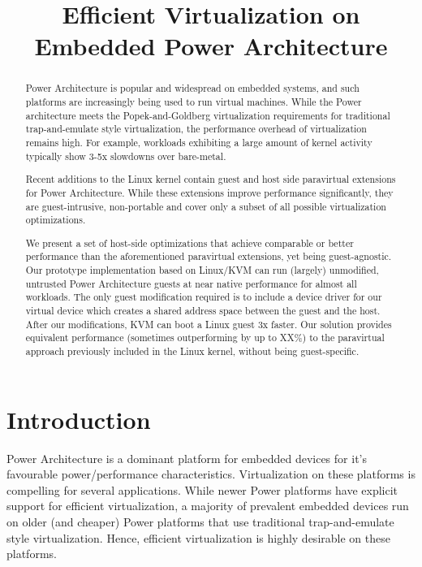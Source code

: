\documentclass[10pt,twocolumn]{article}
\begin{document}
\title{Efficient Virtualization on Embedded Power Architecture}
\author{}
\date{}
\maketitle
\thispagestyle{empty}

\maketitle
\begin{abstract}
  Power Architecture is popular and widespread on embedded systems, and such
  platforms are
  increasingly
  being used to run virtual machines\cite{XXX}. While the Power architecture meets the
  Popek-and-Goldberg virtualization requirements for traditional trap-and-emulate
  style virtualization, the performance overhead of virtualization remains high.
  For example, workloads exhibiting a large amount of kernel activity typically
  show 3-5x slowdowns over bare-metal.

  Recent additions to the Linux kernel contain guest and host side paravirtual
  extensions for Power Architecture. While these extensions improve performance significantly, they
  are guest-intrusive, non-portable and cover only a subset of all possible
  virtualization optimizations.

  We present a set of host-side optimizations that achieve comparable
  or better performance
  than the aforementioned paravirtual extensions, yet being guest-agnostic. Our
  prototype implementation based on Linux/KVM can run (largely) unmodified, untrusted
  Power Architecture guests at near native performance for almost all workloads. The only
  guest modification required is to include a device driver for our virtual
  device which creates a shared address space between the guest and the host.
  After our modifications, KVM can boot a Linux guest 3x faster. Our solution
  provides equivalent performance (sometimes outperforming by up to XX\%) to
  the paravirtual approach previously included in the Linux kernel, without
  being guest-specific.
\end{abstract}
\section{Introduction}
Power Architecture is a dominant platform for embedded devices for it's
favourable power/performance characteristics. Virtualization on these platforms is
compelling for several applications\cite{XXX}. While newer Power platforms
have explicit support for efficient virtualization\cite{XXX}, a majority of
prevalent embedded devices run on older (and cheaper) Power platforms that use
traditional trap-and-emulate style virtualization\cite{XXX}. Hence, efficient
virtualization is highly desirable on these platforms.
\end{document}
